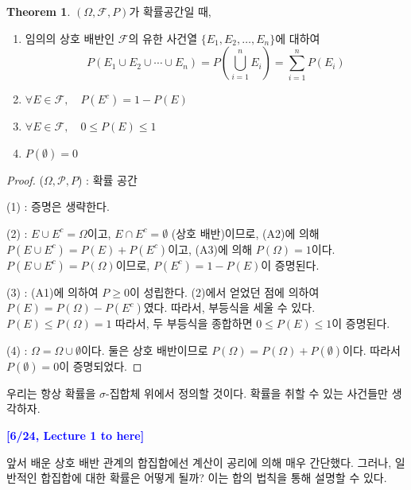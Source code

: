 \documentclass{article}
\theoremstyle{definition}
\newtheorem{theorem}{Theorem}
\begin{document}
\begin{theorem}
    $(\Omega, \mathcal{F}, P)$가 확률공간일 때,

\begin{enumerate}
  \item 임의의 상호 배반인 $\mathcal{F}$의 유한 사건열 $\{E_1, E_2, \dots, E_n\}$에 대하여
  \[
  P(E_1 \cup E_2 \cup \cdots \cup E_n) = P\left( \bigcup_{i=1}^n E_i \right) = \sum_{i=1}^n P(E_i)
  \]

  \item $\forall E \in \mathcal{F}, \quad P(E^c) = 1 - P(E)$

  \item $\forall E \in \mathcal{F}, \quad 0 \leq P(E) \leq 1$

  \item $P(\emptyset) = 0$
\end{enumerate}
\end{theorem}

\begin{proof}
    ($\Omega, \mathcal{P}, P$) : 확률 공간

    \noindent
    (1) : 증명은 생략한다.

    \noindent
    (2) : $E \cup E^c = \Omega$이고, $E \cap E^c = \emptyset$ (상호 배반)이므로, (A2)에 의해 $P(E\cup E^c) = P(E) + P(E^c)$이고, (A3)에 의해 $P(\Omega) = 1$이다. $P(E \cup E^c) = P(\Omega)$이므로, $P(E^c) = 1-P(E)$이 증명된다.

    \noindent
    (3) : (A1)에 의하여 $P \geq 0$이 성립한다. (2)에서 얻었던 점에 의하여 $P(E) = P(\Omega) - P(E^c)$였다. 따라서, 부등식을 세울 수 있다. $P(E) \leq P(\Omega) = 1$ 따라서, 두 부등식을 종합하면 $0 \leq P(E) \leq 1$이 증명된다.

    \noindent
    (4) : $\Omega = \Omega \cup \emptyset$이다. 둘은 상호 배반이므로 $P(\Omega) = P(\Omega) + P(\emptyset)$이다. 따라서 $P(\emptyset) = 0$이 증명되었다. 
\end{proof}

\noindent
우리는 항상 확률을 $\sigma$-집합체 위에서 정의할 것이다. 확률을 취할 수 있는 사건들만 생각하자.

\noindent
\textcolor{blue}{\textbf{[6/24, Lecture 1 to here]}}

\newpage

\noindent
앞서 배운 상호 배반 관계의 합집합에선 계산이 공리에 의해 매우 간단했다. 그러나, 일반적인 합집합에 대한 확률은 어떻게 될까? 이는 합의 법칙을 통해 설명할 수 있다.
\end{document}
